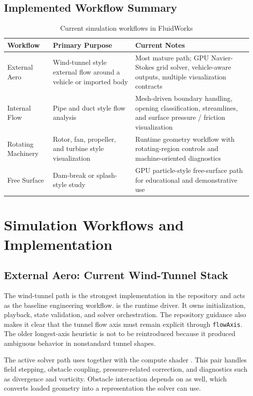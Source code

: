 \documentclass[12pt,a4paper,titlepage]{report}
\begin{document}
\section{Implemented Workflow Summary}
\begin{table}[H]
\centering
\caption{Current simulation workflows in FluidWorks}
\label{tab:modes}
\begin{tabular}{p{3.0cm}p{4.2cm}p{6.3cm}}
\toprule
\textbf{Workflow} & \textbf{Primary Purpose} & \textbf{Current Notes} \\
\midrule
External Aero & Wind-tunnel style external flow around a vehicle or imported body & Most mature path; GPU Navier-Stokes grid solver, vehicle-aware outputs, multiple visualization contracts \\
Internal Flow & Pipe and duct style flow analysis & Mesh-driven boundary handling, opening classification, streamlines, and surface pressure / friction visualization \\
Rotating Machinery & Rotor, fan, propeller, and turbine style visualization & Runtime geometry workflow with rotating-region controls and machine-oriented diagnostics \\
Free Surface & Dam-break or splash-style study & GPU particle-style free-surface path for educational and demonstrative use \\
\bottomrule
\end{tabular}
\end{table}

\chapter{Simulation Workflows and Implementation}
\section{External Aero: Current Wind-Tunnel Stack}
The wind-tunnel path is the strongest implementation in the repository and acts as the baseline engineering workflow.  is the runtime driver. It owns initialization, playback, state validation, and solver orchestration. The repository guidance also makes it clear that the tunnel flow axis must remain explicit through \texttt{flowAxis}. The older longest-axis heuristic is not to be reintroduced because it produced ambiguous behavior in nonstandard tunnel shapes.

The active solver path uses  together with the compute shader . This pair handles field stepping, obstacle coupling, pressure-related correction, and diagnostics such as divergence and vorticity. Obstacle interaction depends on  as well, which converts loaded geometry into a representation the solver can use.
\end{document}

